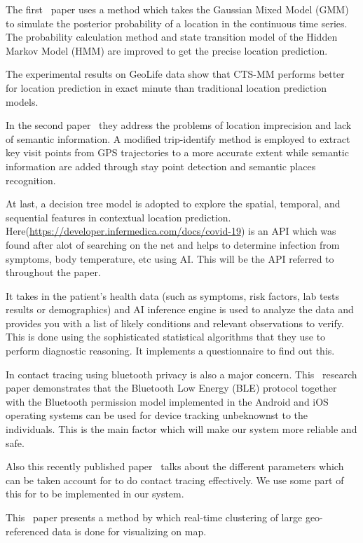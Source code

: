 \documentclass[10pt,twocolumn,letterpaper]{article}
\begin{document}
The first~\cite{3} paper uses a method which takes the Gaussian Mixed Model (GMM) to simulate the posterior probability of a location in the continuous time series. The probability calculation method and state transition model of the Hidden Markov Model (HMM) are improved to get the precise location prediction.

The experimental results on GeoLife data show that CTS-MM performs better for location prediction in exact minute than traditional location prediction models.

In the second paper~\cite{4} they address the problems of location imprecision and lack of semantic information. A modified trip-identify method is employed to extract key visit points from GPS trajectories to a more accurate extent while semantic information are added through stay point detection and semantic places recognition.

At last, a decision tree model is adopted to explore the spatial, temporal, and sequential features in contextual location prediction.\newline\newline
Here(\url{https://developer.infermedica.com/docs/covid-19}) is an API which was found after alot of searching on the net and helps to determine infection from symptoms, body temperature, etc using AI. This will be the API referred to throughout the paper.

It takes in the patient’s health data (such as symptoms, risk factors, lab tests results or demographics) and AI inference engine is used to analyze the data and provides you with a list of likely conditions and relevant observations to verify. This is done using the sophisticated statistical algorithms that they use to perform diagnostic reasoning. It implements a questionnaire to find out this.

In contact tracing using bluetooth privacy is also a major concern.
This~\cite{5} research paper demonstrates that the Bluetooth Low Energy (BLE) protocol together with the Bluetooth permission model implemented in the Android and iOS operating systems can be used for device tracking unbeknownst to the individuals. This is the main factor which will make our system more reliable and safe.

Also this recently published paper~\cite{6} talks about the different parameters which can be taken account for to do contact tracing effectively. We use some part of this for to be implemented in our system.

This~\cite{7} paper presents a method by which real-time clustering of large geo-referenced data is done for visualizing on map.
\end{document}
